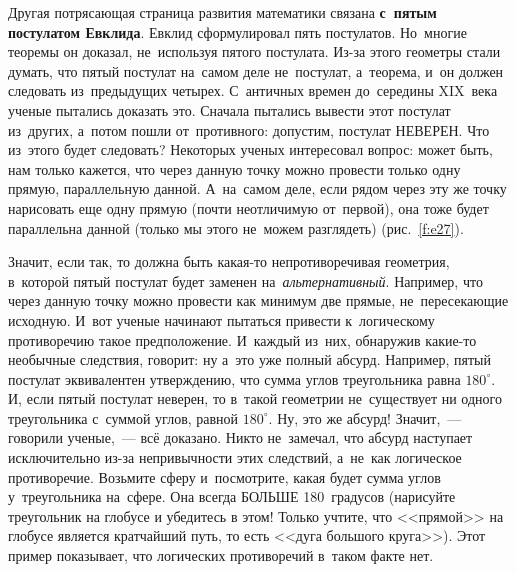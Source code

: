 Другая потрясающая страница развития математики связана \textbf{с~пятым постулатом Евклида}. Евклид
сформулировал пять постулатов. Но~многие теоремы он доказал, не~используя пятого постулата. Из-за
этого геометры стали думать, что пятый постулат на~самом деле не~постулат, а~теорема, и~он должен
следовать из~предыдущих четырех. С~античных времен до~середины XIX~века ученые пытались
доказать это. Сначала пытались вывести этот постулат из~других, а~потом пошли от~противного:
допустим,  постулат НЕВЕРЕН. Что из~этого будет следовать? Некоторых ученых интересовал вопрос:
может быть, нам только кажется, что через данную точку можно провести только одну прямую,
параллельную данной. А~на~самом деле, если рядом через эту же точку нарисовать еще одну прямую
(почти неотличимую от~первой), она тоже будет параллельна данной (только мы этого не~можем
разглядеть) (рис.~\ref{f:e27}).


Значит, если так, то должна быть какая-то непротиворечивая геометрия, в~которой пятый постулат
будет заменен на~\textit{альтернативный}. Например, что через данную точку можно провести как минимум две
прямые, не~пересекающие исходную. И~вот ученые начинают пытаться привести к~логическому
противоречию такое предположение. И~каждый из~них, обнаружив какие-то необычные следствия, говорит:
ну а~это уже полный абсурд. Например, пятый постулат эквивалентен утверждению, что сумма углов
треугольника равна $180^{\circ}$. И, если пятый постулат неверен, то в~такой геометрии не~существует ни
одного треугольника с~суммой углов, равной $180^{\circ}$. Ну, это же абсурд! Значит,~--- говорили ученые,~---
всё доказано. Никто не~замечал, что абсурд наступает исключительно из-за непривычности этих
следствий, а~не~как логическое противоречие. Возьмите сферу и~посмотрите, какая будет сумма углов
у~треугольника на~сфере. Она всегда БОЛЬШЕ 180~градусов (нарисуйте треугольник на глобусе и убедитесь в этом!
Только учтите, что <<прямой>> на глобусе является кратчайший путь, то есть <<дуга большого круга>>). Этот пример показывает, что логических
противоречий в~таком факте нет.

